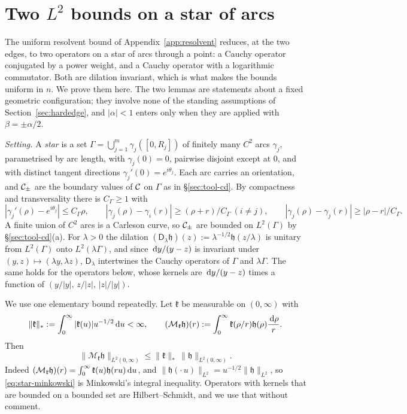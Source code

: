 
\section{Two \texorpdfstring{$L^2$}{L2} bounds on a star of arcs}\label{app:L2}

The uniform resolvent bound of Appendix~\ref{app:resolvent} reduces, at the two edges, to two operators on a star of
arcs through a point: a Cauchy operator conjugated by a power weight, and a Cauchy operator with a logarithmic
commutator. Both are dilation invariant, which is what makes the bounds uniform in $n$. We prove them here. The two
lemmas are statements about a fixed geometric configuration; they involve none of the standing assumptions of
Section~\ref{sec:hardedge}, and $|\alpha|<1$ enters only when they are applied with $\beta=\pm\alpha/2$.

\emph{Setting.} A \emph{star} is a set $\Gamma=\bigcup_{j=1}^m\gamma_j([0,R_j])$ of finitely many $C^2$ arcs
$\gamma_j$, parametrised by arc length, with $\gamma_j(0)=0$, pairwise disjoint except at $0$, and with distinct
tangent directions $\gamma_j'(0)=e^{i\theta_j}$. Each arc carries an orientation, and $\mathcal{C}_\pm$ are the boundary
values of $\mathcal{C}$ on $\Gamma$ as in \S\ref{sec:tool-cd}. By compactness and transversality there is $C_\Gamma\ge1$ with
\begin{equation}\label{eq:star-geom}
  |\gamma_j'(\rho)-e^{i\theta_j}|\le C_\Gamma\rho,\qquad |\gamma_j(\rho)-\gamma_i(r)|\ge(\rho+r)/C_\Gamma\ (i\ne j),\qquad
  |\gamma_j(\rho)-\gamma_j(r)|\ge|\rho-r|/C_\Gamma .
\end{equation}
A finite union of $C^2$ arcs is a Carleson curve, so $\mathcal{C}_\pm$ are bounded on $L^2(\Gamma)$ by \S\ref{sec:tool-cd}(a). For
$\lambda>0$ the dilation $(\mathsf D_\lambda\mathfrak h)(z):=\lambda^{-1/2}\mathfrak h(z/\lambda)$ is unitary from $L^2(\Gamma)$ onto
$L^2(\lambda\Gamma)$, and since $\,\mathrm{d} y/(y-z)$ is invariant under $(y,z)\mapsto(\lambda y,\lambda z)$, $\mathsf D_\lambda$
intertwines the Cauchy operators of $\Gamma$ and $\lambda\Gamma$. The same holds for the operators below, whose kernels
are $\,\mathrm{d} y/(y-z)$ times a function of $(y/|y|,\,z/|z|,\,|z|/|y|)$.

We use one elementary bound repeatedly. Let $\mathfrak k$ be measurable on $(0,\infty)$ with
\[
  \|\mathfrak k\|_*:=\int_0^\infty|\mathfrak k(u)|u^{-1/2}\,\mathrm{d} u<\infty,\qquad
  (\mathcal M_{\mathfrak k}\mathfrak h)(r):=\int_0^\infty\mathfrak k(\rho/r)\mathfrak h(\rho)\frac{\,\mathrm{d}\rho}r .
\]
Then
\begin{equation}\label{eq:star-minkowski}
  \|\mathcal M_{\mathfrak k}\mathfrak h\|_{L^2(0,\infty)}\le\|\mathfrak k\|_*\,\|\mathfrak h\|_{L^2(0,\infty)} .
\end{equation}
Indeed $(\mathcal M_{\mathfrak k}\mathfrak h)(r)=\int_0^\infty\mathfrak k(u)\mathfrak h(ru)\,\mathrm{d} u$, and $\|\mathfrak h(\cdot\,u)\|_{L^2}=u^{-1/2}
\|\mathfrak h\|_{L^2}$, so \eqref{eq:star-minkowski} is Minkowski's integral inequality. Operators
with kernels that are bounded on a bounded set are Hilbert--Schmidt, and we use that without comment.

